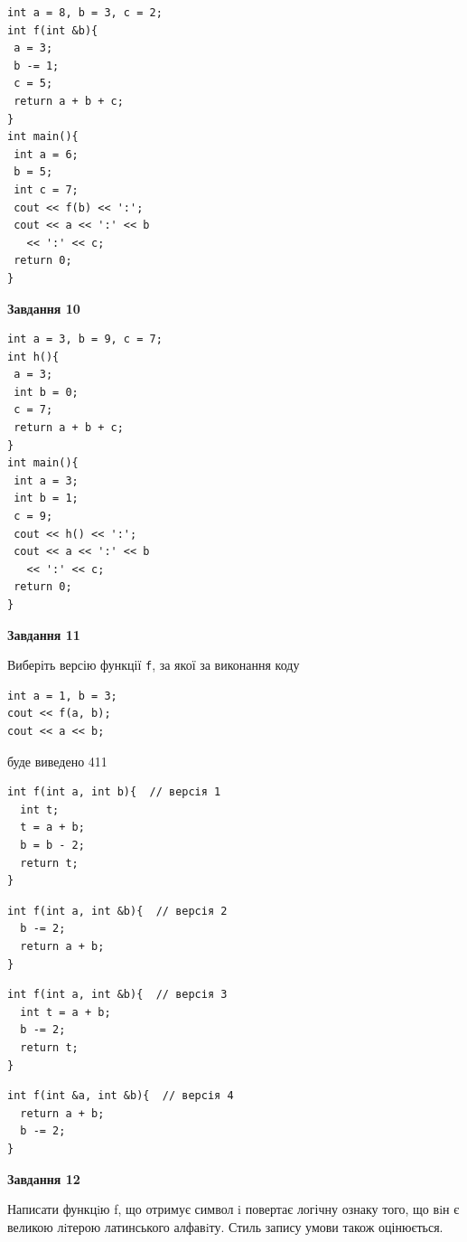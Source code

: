 \documentclass[12pt, ukrainian]{article}
\def\code#1{\Verb!#1!}
\begin{document}
{\begin {large}
\begin{minipage}[t]{7.0cm}
\begin{verbatim}
int a = 8, b = 3, c = 2;
int f(int &b){
 a = 3;
 b -= 1;
 c = 5;
 return a + b + c;
}
int main(){
 int a = 6;
 b = 5;
 int c = 7;
 cout << f(b) << ':';
 cout << a << ':' << b 
   << ':' << c;
 return 0;
}
\end{verbatim}



\begin{center}
\textbf{Завдання 10}
\end{center}
\vspace{-8mm}

\begin{verbatim}
int a = 3, b = 9, c = 7;
int h(){
 a = 3;
 int b = 0;
 c = 7;
 return a + b + c;
}
int main(){
 int a = 3;
 int b = 1;
 c = 9;
 cout << h() << ':';
 cout << a << ':' << b 
   << ':' << c;
 return 0;
}
\end{verbatim}

\end{minipage}
\vline \hspace{1mm}
\begin{minipage}[t]{11.0cm}

\begin{center}
\textbf{Завдання 11}
\end{center}
Виберіть версію функції \code{f}, за якої за виконання коду
\begin{verbatim}
int a = 1, b = 3;
cout << f(a, b);
cout << a << b;
\end{verbatim}

буде виведено 411

\begin{verbatim}
int f(int a, int b){  // версія 1
  int t;
  t = a + b;
  b = b - 2;
  return t;
}
\end{verbatim}

\vspace{-8mm}\begin{verbatim}
int f(int a, int &b){  // версія 2
  b -= 2;
  return a + b;
}
\end{verbatim}

\vspace{-8mm}\begin{verbatim}
int f(int a, int &b){  // версія 3
  int t = a + b;
  b -= 2;
  return t;
}
\end{verbatim}

\vspace{-8mm}\begin{verbatim}
int f(int &a, int &b){  // версія 4
  return a + b;
  b -= 2;
}
\end{verbatim}



\begin{center}
\textbf{Завдання 12}
\end{center}

Написати функцiю f, що отримує символ i повертає логічну ознаку того, що вiн є великою лiтерою латинського алфавiту. Стиль запису умови також оцінюється.\par

\end{minipage}

\end {large}}
\end{document}
